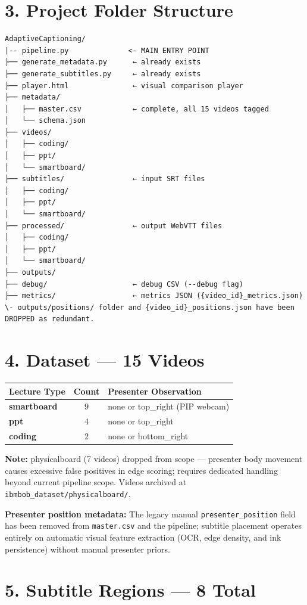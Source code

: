 \documentclass[11pt]{article}
\begin{document}
\section*{3. Project Folder Structure}
\begin{verbatim}
AdaptiveCaptioning/
|-- pipeline.py              <- MAIN ENTRY POINT
├── generate_metadata.py      ← already exists
├── generate_subtitles.py     ← already exists
├── player.html               ← visual comparison player
├── metadata/
│   ├── master.csv            ← complete, all 15 videos tagged
│   └── schema.json
├── videos/
│   ├── coding/
│   ├── ppt/
│   └── smartboard/
├── subtitles/                ← input SRT files
│   ├── coding/
│   ├── ppt/
│   └── smartboard/
├── processed/                ← output WebVTT files
│   ├── coding/
│   ├── ppt/
│   └── smartboard/
├── outputs/
├── debug/                    ← debug CSV (--debug flag)
├── metrics/                  ← metrics JSON ({video_id}_metrics.json)
\- outputs/positions/ folder and {video_id}_positions.json have been DROPPED as redundant.
\end{verbatim}

\section*{4. Dataset --- 15 Videos}
\begin{tabularx}{\textwidth}{>{\bfseries}l c X}
Lecture Type & Count & Presenter Observation \\
\midrule
smartboard & 9 & none or top\_right (PIP webcam) \\
ppt & 4 & none or top\_right \\
coding & 2 & none or bottom\_right \\
\end{tabularx}

\textbf{Note:} physicalboard (7 videos) dropped from scope --- presenter body movement causes excessive false positives in edge scoring; requires dedicated handling beyond current pipeline scope. Videos archived at \texttt{ibmbob\_dataset/physicalboard/}.

\textbf{Presenter position metadata:} The legacy manual \texttt{presenter\_position} field has been removed from \texttt{master.csv} and the pipeline; subtitle placement operates entirely on automatic visual feature extraction (OCR, edge density, and ink persistence) without manual presenter priors.

\section*{5. Subtitle Regions --- 8 Total}
\end{document}
